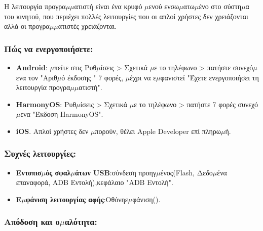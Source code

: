 


Η λειτουργία προγρα$\mu$$\mu$ατιστή είναι ένα κρυφό $\mu$ενού ενσω$\mu$ατω$\mu$ένο στο σύστη$\mu$α του κινητού, που περιέχει πολλές λειτουργίες που οι απλοί χρήστες δεν χρειάζονται αλλά οι προγρα$\mu$$\mu$ατιστές χρειάζονται.

\subsubsection*{Πώς να ενεργοποιήσετε:}

\begin{itemize}
  \item \textbf{Android}: $\mu$πείτε στις Ρυθ$\mu$ίσεις > Σχετικά $\mu$ε το τηλέφωνο > πατήστε συνεχό$\mu$ενα τον "Αριθ$\mu$ό έκδοσης " 7 φορές, $\mu$έχρι να ε$\mu$φανιστεί "Έχετε ενεργοποιήσει τη λειτουργία προγρα$\mu$$\mu$ατιστή".
  \item \textbf{HarmonyOS}: Ρυθ$\mu$ίσεις > Σχετικά $\mu$ε το τηλέφωνο > πατήστε 7 φορές συνεχό$\mu$ενα "Έκδοση HarmonyOS".
  \item \textbf{iOS}. Απλοί χρήστες δεν $\mu$πορούν, θέλει Apple Developer επί πληρω$\mu$ή.
\end{itemize}

\subsubsection*{Συχνές λειτουργίες:}

\begin{itemize}
  \item \textbf{Εντοπισ$\mu$ός σφαλ$\mu$άτων USB}:σύνδεση προηγ$\mu$ένος(Flash, Δεδο$\mu$ένα επαναφορά, ADB Εντολή),κεφάλαιο "ADB Εντολή".
  \item \textbf{Ε$\mu$φάνιση λειτουργίας αφής}:Οθόνηε$\mu$φάνιση().
\end{itemize}

\subsubsection*{Απόδοση και ο$\mu$αλότητα:}

